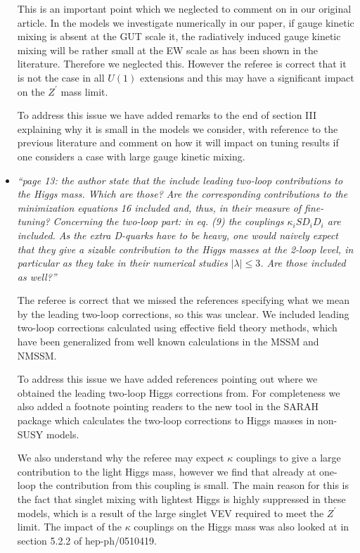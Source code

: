\documentclass[12pt]{article}
\begin{document}
\begin{itemize}
This is an important point which we neglected to comment on in our
original article.  In the models we investigate numerically in our
paper, if gauge kinetic mixing is absent at the GUT scale it, the
radiatively induced gauge kinetic mixing will be rather small at the
EW scale as has been shown in the literature.  Therefore we neglected
this.  However the referee is correct that it is not the case in all
$U(1)$ extensions and this may have a significant impact on the
$Z^\prime$ mass limit.

To address this issue we have added remarks to the end of section III
explaining why it is small in the models we consider, with reference
to the previous literature and comment on how it will impact on tuning
results if one considers a case with large gauge kinetic mixing.

\item {\it ``page 13: the author state that the include leading
two-loop contributions to the Higgs mass.  Which are those?  Are the
corresponding contributions to the minimization equations 16 included
and, thus, in their measure of fine-tuning?  Concerning the two-loop part:
in eq. (9) the couplings $\kappa_i S D_i D_i$ are included.  As the extra
D-quarks have to be heavy, one would naively expect that they give a
sizable contribution to the Higgs masses at the 2-loop level, in particular
as they take in their numerical studies $|\lambda| \leq 3$.  Are those
included as well?''}

The referee is correct that we missed the references specifying what
we mean by the leading two-loop corrections, so this was unclear.  We
included leading two-loop corrections calculated using effective field
theory methods, which have been generalized from well known
calculations in the MSSM and NMSSM.

To address this issue we have added references pointing out where we
obtained the leading two-loop Higgs corrections from.  For
completeness we also added a footnote pointing readers to the new tool
in the SARAH package which calculates the two-loop corrections to
Higgs masses in non-SUSY models.

We also understand why the referee may expect $\kappa$ couplings to give
a large contribution to the light Higgs mass, however we find that already
at one-loop the contribution from this coupling is small. The main reason
for this is the fact that singlet mixing with lightest Higgs is highly
suppressed in these models, which is a result of the large singlet VEV
required to meet the $Z^\prime$ limit.  The impact of the $\kappa$
couplings on the Higgs mass was also looked at in section 5.2.2 of
hep-ph/0510419.


\end{itemize}
\end{document}
